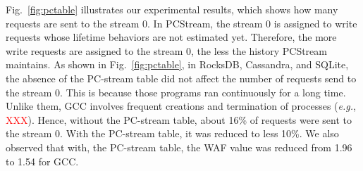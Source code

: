 Fig.~\ref{fig:pctable} illustrates our experimental results, which shows how
many requests are sent to the stream 0. In \textsf{PCStream}, the stream 0 is
assigned to write requests whose lifetime behaviors are not estimated yet.
Therefore, the more write requests are assigned to the stream 0, the less the
history \textsf{PCStream} maintains. As shown in Fig.~\ref{fig:pctable}, in
RocksDB, Cassandra, and SQLite, the absence of the PC-stream table did not
affect the number of requests send to the stream 0. This is because those
programs ran continuously for a long time. Unlike them, GCC involves frequent
creations and termination of processes (\textit{e.g.}, \textcolor{red}{XXX}).
Hence, without the PC-stream table, about 16\% of requests were sent to the
stream 0. With the PC-stream table, it was reduced to less 10\%. We also
observed that with, the PC-stream table, the WAF value was reduced from 1.96 to
1.54 for GCC.

